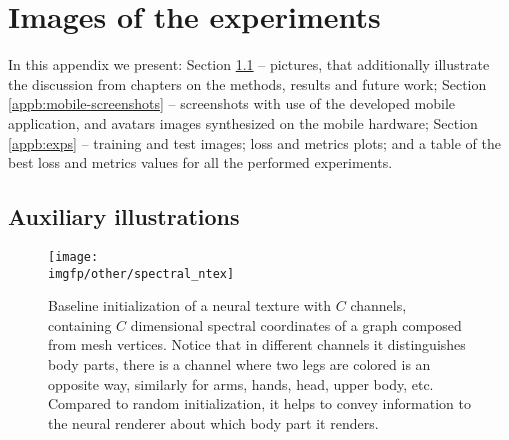 \chapter{Images of the experiments}
In this appendix we present: Section \ref{appb:fig} -- pictures, that additionally illustrate the discussion from chapters on the methods, results and future work; Section \ref{appb:mobile-screenshots} -- screenshots with use of the developed mobile application, and avatars images synthesized on the mobile hardware; Section \ref{appb:exps} -- training and test images; loss and metrics plots; and a table of the best loss and metrics values for all the performed experiments.


\section{Auxiliary illustrations}
\label{appb:fig}
\begin{figure}[!h]
	\centering
	\texttt{[image: \\imgfp/other/spectral\_ntex]}
	\caption{Baseline initialization of a neural texture with $C$ channels, containing $C$ dimensional spectral coordinates of a graph composed from mesh vertices. Notice that in different channels it distinguishes body parts, there is a channel where two legs are colored is an opposite way, similarly for arms, hands, head, upper body, etc. Compared to random initialization, it helps to convey information to the neural renderer about which body part it renders.}
	\label{fig:spectral_ntex}
\end{figure}


